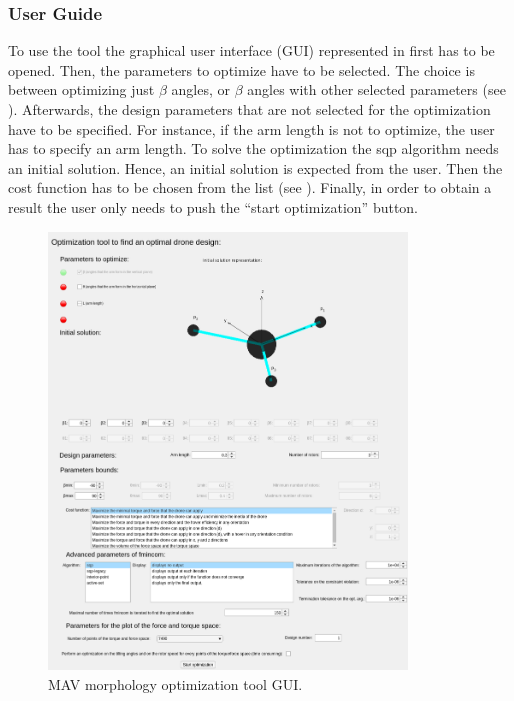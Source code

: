 \subsubsection{User Guide}
\label{sec:user_guide}
To use the tool the graphical user interface (GUI) represented in 
first has to be opened. Then, the parameters to optimize have to be selected. The
choice is between optimizing just $\beta$ angles, or $\beta$ angles with other
selected parameters (see ). Afterwards, the design parameters that
are not selected for the optimization have to be specified. For instance, if the arm
length is not to optimize,  the user has to specify an arm length. To solve the
optimization the sqp algorithm needs an initial solution. Hence, an initial solution
is expected from the user. Then the cost function has to be chosen from the list
(see ). Finally, in order to obtain a result the user only needs to
push the “start optimization” button.

\begin{figure}[!h]
  \centering
  \includegraphics[width=0.85\textwidth]{images/gui.png}
  \caption{MAV morphology optimization tool GUI.}
  \label{fig:gui}
\end{figure}

